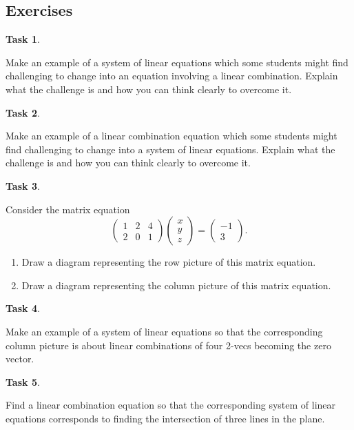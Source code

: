 \documentclass[10pt,]{book}
\theoremstyle{plain}
\theoremstyle{definition}
\numberwithin{equation}{section}
\newtheorem{task}{Task}[chapter]
\begin{document}
\subsection[Exercises]{Exercises}\label{subsection-23}
\begin{task}
\label{task-31}

        Make an example of a system of linear equations which some students might
        find challenging to change into an equation involving a linear combination.
        Explain what the challenge is and how you can think clearly to overcome it.
      \end{task}
\begin{task}
\label{task-32}

        Make an example of a linear combination equation which some students might
        find challenging to change into a system of linear equations. Explain
        what the challenge is and how you can think clearly to overcome it.
      \end{task}
\begin{task}
\label{task-33}

        Consider the matrix equation\[
        \begin{pmatrix}1 & 2 & 4 \\ 2 & 0 & 1 \end{pmatrix}
          \begin{pmatrix} x \\ y \\ z \end{pmatrix} = \begin{pmatrix} -1 \\ 3
          \end{pmatrix}.
        \]\begin{enumerate}
\item{}
            Draw a diagram representing the row picture of this matrix equation.
          \item{}
            Draw a diagram representing the column picture of this matrix equation.
          \end{enumerate}
\end{task}
\begin{task}
\label{task-34}

        Make an example of a system of linear equations so that the
        corresponding column picture is about linear combinations of four 2-vecs
        becoming the zero vector.
      \end{task}
\begin{task}
\label{task-35}

        Find a linear combination equation so that the corresponding system of
        linear equations corresponds to finding the intersection of three lines
        in the plane.
      \end{task}
\end{document}
